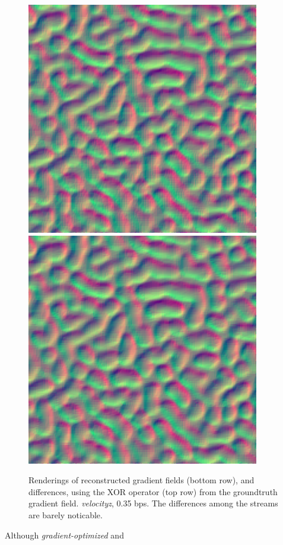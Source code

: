\begin{figure}[h]
{	{\includegraphics[width=0.23\linewidth]{img/gradient/gradient_2.png}}
	{\includegraphics[width=0.23\linewidth]{img/gradient/gradient_3.png}}}
	\caption{Renderings of reconstructed gradient fields (bottom row), and differences, using the XOR
	operator (top row) from the groundtruth gradient field. \emph{velocityz}, 0.35 bps. The
	differences among the streams are barely noticable.}
  \label{fig:gradient-rendering-diff}
\end{figure}

Although \emph{gradient-optimized} and \emph{}


